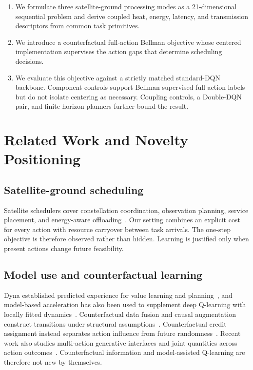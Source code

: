 \documentclass[11pt]{article}
\begin{document}
\begin{enumerate}[leftmargin=1.6em]
    \item We formulate three satellite-ground processing modes as a 21-dimensional sequential problem and derive coupled heat, energy, latency, and transmission descriptors from common task primitives.
    \item We introduce a counterfactual full-action Bellman objective whose centered implementation supervises the action gaps that determine scheduling decisions.
    \item We evaluate this objective against a strictly matched standard-DQN backbone. Component controls support Bellman-supervised full-action labels but do not isolate centering as necessary. Coupling controls, a Double-DQN pair, and finite-horizon planners further bound the result.
\end{enumerate}

\section{Related Work and Novelty Positioning}

\subsection{Satellite-ground scheduling}

Satellite schedulers cover constellation coordination, observation planning, service placement, and energy-aware offloading~\cite{RN8,RN10,RN20,RN22,RN23,RN27,RN28}. Our setting combines an explicit cost for every action with resource carryover between task arrivals. The one-step objective is therefore observed rather than hidden. Learning is justified only when present actions change future feasibility.

\subsection{Model use and counterfactual learning}

Dyna established predicted experience for value learning and planning~\cite{sutton1991dyna}, and model-based acceleration has also been used to supplement deep Q-learning with locally fitted dynamics~\cite{gu2016continuous}. Counterfactual data fusion and causal augmentation construct transitions under structural assumptions~\cite{forney2017counterfactual,armengol2024caiac}. Counterfactual credit assignment instead separates action influence from future randomness~\cite{mesnard2021counterfactual}. Recent work also studies multi-action generative interfaces and joint quantities across action outcomes~\cite{kaya2026joint}. Counterfactual information and model-assisted Q-learning are therefore not new by themselves.
\end{document}

